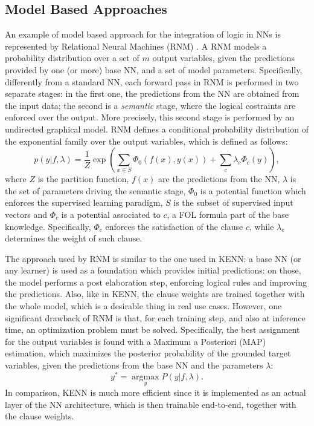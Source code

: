  \subsection{Model Based Approaches}
 An example of model based approach for the integration of logic in NNs is represented by Relational Neural Machines (RNM) \cite{marra2020relational}. A RNM models a probability distribution over a set of $m$ output variables, given the predictions provided by one (or more) base NN, and a set of model parameters. Specifically, differently from a standard NN, each forward pass in RNM is performed in two separate stages: in the first one, the predictions from the NN are obtained from the input data; the second is a \textit{semantic} stage, where the logical costraints are enforced over the output. More precisely, this second stage is performed by an undirected graphical model.
 RNM defines a conditional probability distribution of the exponential family over the output variables, which is defined as follows:
 \begin{equation*}
 p(y|f,\lambda) = \frac{1}{Z} \exp \left( \sum_{x \in S}\Phi_0(f(x),y(x))+\sum_c \lambda_c \Phi_c(y) \right), 
 \end{equation*}
 where $Z$ is the partition function, $f(x)$ are the predictions from the NN, $\lambda$ is the set of parameters driving the semantic stage, $\Phi_0$ is a potential function which enforces the supervised learning paradigm, $S$ is the subset of supervised input vectors and $\Phi_c$ is a potential associated to $c$, a FOL formula part of the base knowledge. Specifically, $\Phi_c$ enforces the satisfaction of the clause $c$, while $\lambda_c$ determines the weight of such clause. 
 
 The approach used by RNM is similar to the one used in KENN: a base NN (or any learner) is used as a foundation which provides initial predictions: on those, the model performs a post elaboration step, enforcing logical rules and improving the predictions. Also, like in KENN, the clause weights are trained together with the whole model, which is a desirable thing in real use cases. However, one significant drawback of RNM is that, for each training step, and also at inference time, an optimization problem must be solved. 
Specifically, the best assignment for the output variables is found with a Maximum a Posteriori (MAP) estimation, which maximizes the posterior probability of the grounded target variables, given the predictions from the base NN and the parameters $\lambda$:
 \begin{equation*}
 y^* = \underset{y}{\operatorname{argmax}}P(y|f,\lambda).
 \end{equation*}
 In comparison, KENN is much more efficient since it is implemented as an actual layer of the NN architecture, which is then trainable end-to-end, together with the clause weights.
 
